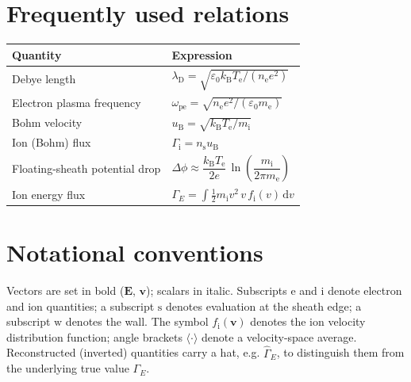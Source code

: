 \section{Frequently used relations}
\begin{longtable}{@{}p{5.2cm}p{9.2cm}@{}}
\toprule
\textbf{Quantity} & \textbf{Expression} \\
\midrule
\endhead
Debye length & $\lambda_{\mathrm{D}} = \sqrt{\varepsilon_{0} k_{\mathrm{B}} T_{\mathrm{e}} / (n_{\mathrm{e}} e^{2})}$ \\
Electron plasma frequency & $\omega_{\mathrm{pe}} = \sqrt{n_{\mathrm{e}} e^{2} / (\varepsilon_{0} m_{\mathrm{e}})}$ \\
Bohm velocity & $u_{\mathrm{B}} = \sqrt{k_{\mathrm{B}} T_{\mathrm{e}} / m_{\mathrm{i}}}$ \\
Ion (Bohm) flux & $\Gamma_{\mathrm{i}} = n_{\mathrm{s}} u_{\mathrm{B}}$ \\
Floating-sheath potential drop & $\Delta\phi \approx \dfrac{k_{\mathrm{B}} T_{\mathrm{e}}}{2e}\,\ln\!\left(\dfrac{m_{\mathrm{i}}}{2\pi m_{\mathrm{e}}}\right)$ \\
Ion energy flux & $\Gamma_{E} = \displaystyle\int \tfrac{1}{2} m_{\mathrm{i}} v^{2}\, v\, f_{\mathrm{i}}(v)\, \mathrm{d}v$ \\
\bottomrule
\end{longtable}

\section{Notational conventions}
Vectors are set in bold ($\bm{E}$, $\bm{v}$); scalars in italic. Subscripts
$\mathrm{e}$ and $\mathrm{i}$ denote electron and ion quantities; a subscript
$\mathrm{s}$ denotes evaluation at the sheath edge; a subscript $\mathrm{w}$
denotes the wall. The symbol $f_{\mathrm{i}}(\bm{v})$ denotes the ion velocity
distribution function; angle brackets $\langle\cdot\rangle$ denote a
velocity-space average. Reconstructed (inverted) quantities carry a hat, e.g.
$\hat{\Gamma}_{E}$, to distinguish them from the underlying true value
$\Gamma_{E}$.
